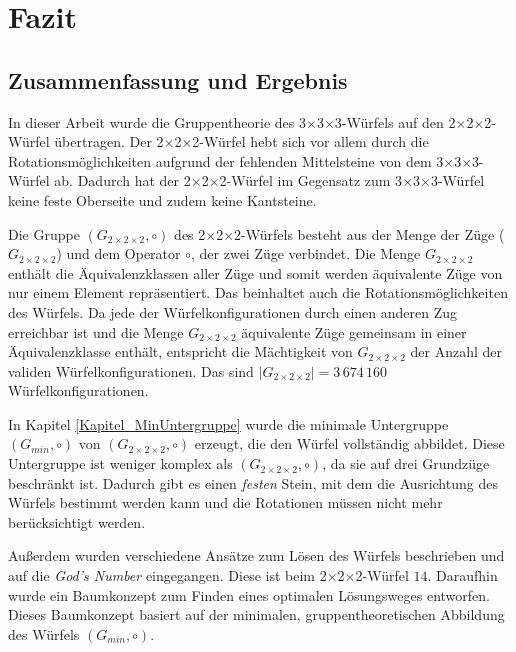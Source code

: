 \documentclass[12pt,a4paper, usenames, dvipsnames]{article}
\theoremstyle{mystyle}
\theoremstyle{definition}
\newcommand{\Gtwo}{\ensuremath{G_{2\times 2\times 2}}}
\newcommand{\Ttwo}{2$\times$2$\times$2-}
\newcommand{\Tthree}{3$\times$3$\times$3-}
\begin{document}
%
%
%
%
%
%
%
%
%
%
%
%
%
%
%
%
%
%

\newpage
\section{Fazit}

\label{Kapitel_Fazit}


%
%
%
%
%
%
%
%
%
%
%
%
%
%
%
%
%
%
%
%
\subsection{Zusammenfassung und Ergebnis}

In dieser Arbeit wurde die Gruppentheorie des \Tthree Würfels auf den \Ttwo Würfel übertragen. Der \Ttwo Würfel hebt sich vor allem durch die Rotationsmöglichkeiten aufgrund der fehlenden Mittelsteine von dem \Tthree Würfel ab. Dadurch hat der \Ttwo Würfel im Gegensatz zum \Tthree Würfel keine feste Oberseite und zudem keine Kantsteine.

Die Gruppe $(\Gtwo, \circ)$ des \Ttwo Würfels besteht aus der Menge der Züge ($\Gtwo$) und dem Operator $\circ$, der zwei Züge verbindet. Die Menge $\Gtwo$ enthält die Äquivalenzklassen aller Züge und somit werden äquivalente Züge von nur einem Element repräsentiert. Das beinhaltet auch die Rotationsmöglichkeiten des Würfels.
Da jede der Würfelkonfigurationen durch einen anderen Zug erreichbar ist und die Menge $\Gtwo$ äquivalente Züge gemeinsam in einer Äquivalenzklasse enthält, entspricht die Mächtigkeit von $\Gtwo$ der Anzahl der validen Würfelkonfigurationen. Das sind $|\Gtwo| = 3 \, 674 \, 160$ Würfelkonfigurationen. 

In Kapitel \ref{Kapitel_MinUntergruppe} wurde die minimale Untergruppe $(G_{min}, \circ)$ von  $(\Gtwo, \circ)$ erzeugt, die den Würfel vollständig abbildet. Diese Untergruppe ist weniger komplex als $(\Gtwo, \circ)$, da sie auf drei Grundzüge beschränkt ist. Dadurch gibt es einen \textit{festen} Stein, mit dem die Ausrichtung des Würfels bestimmt werden kann und die Rotationen müssen nicht mehr berücksichtigt werden.

Außerdem wurden verschiedene Ansätze zum Lösen des Würfels beschrieben und auf die \textit{God's Number} eingegangen. Diese ist beim \Ttwo Würfel $14$. Daraufhin wurde ein Baumkonzept zum Finden eines optimalen Lösungsweges entworfen. Dieses Baumkonzept basiert auf der minimalen, gruppentheoretischen Abbildung des Würfels $(G_{min}, \circ)$.
\end{document}
